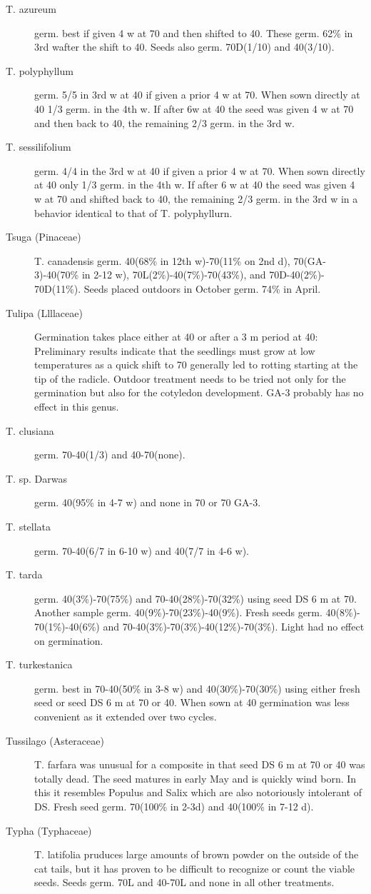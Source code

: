 \begin{description}
\item[T. azureum] germ. best if given 4 w at 70 and then shifted to 40. These germ.
62\% in 3rd wafter the shift to 40. Seeds also germ. 70D(1/10) and 40(3/10).
\item[T. polyphyllum] germ. 5/5 in 3rd w at 40 if given a prior 4 w at 70. When sown
directly at 40 1/3 germ. in the 4th w. If after 6w at 40 the seed was given 4 w at 70 and
then back to 40, the remaining 2/3 germ. in the 3rd w.
\item[T. sessilifolium] germ. 4/4 in the 3rd w at 40 if given a prior 4 w at 70. When
sown directly at 40 only 1/3 germ. in the 4th w. If after 6 w at 40 the seed was given 4
w at 70 and shifted back to 40, the remaining 2/3 germ. in the 3rd w in a behavior
identical to that of T. polyphyllurn.

\item[Tsuga (Pinaceae)] T. canadensis germ. 40(68\% in 12th w)-70(11\% on 2nd
d), 70(GA-3)-40(70\% in 2-12 w), 70L(2\%)-40(7\%)-70(43\%), and 70D-40(2\%)-
70D(11\%). Seeds placed outdoors in October germ. 74\% in April.

\item[Tulipa (Llllaceae)] Germination takes place either at 40 or after a 3 m
period at 40: Preliminary results indicate that the seedlings must grow at low
temperatures as a quick shift to 70 generally led to rotting starting at the tip of the
radicle. Outdoor treatment needs to be tried not only for the germination but also for
the cotyledon development. GA-3 probably has no effect in this genus.
\item[T. clusiana] germ. 70-40(1/3) and 40-70(none).
\item[T. sp. Darwas] germ. 40(95\% in 4-7 w) and none in 70 or 70 GA-3.
\item[T. stellata] germ. 70-40(6/7 in 6-10 w) and 40(7/7 in 4-6 w).
\item[T. tarda] germ. 40(3\%)-70(75\%) and 70-40(28\%)-70(32\%) using seed DS 6 m at
70. Another sample germ. 40(9\%)-70(23\%)-40(9\%). Fresh seeds germ. 40(8\%)-
70(1\%)-40(6\%) and 70-40(3\%)-70(3\%)-40(12\%)-70(3\%). Light had no effect on
germination.
\item[T. turkestanica] germ. best in 70-40(50\% in 3-8 w) and 40(30\%)-70(30\%) using
either fresh seed or seed DS 6 m at 70 or 40. When sown at 40 germination was less
convenient as it extended over two cycles.
\item[Tussilago (Asteraceae)] T. farfara was unusual for a composite in that seed
DS 6 m at 70 or 40 was totally dead. The seed matures in early May and is quickly
wind born. In this it resembles Populus and Salix which are also notoriously intolerant
of DS. Fresh seed germ. 70(100\% in 2-3d) and 40(100\% in 7-12 d).
\item[Typha (Typhaceae)] T. latifolia pruduces large amounts of brown powder
on the outside of the cat tails, but it has proven to be difficult to recognize or count the
viable seeds. Seeds germ. 70L and 40-70L and none in all other treatments.

\end{description}
